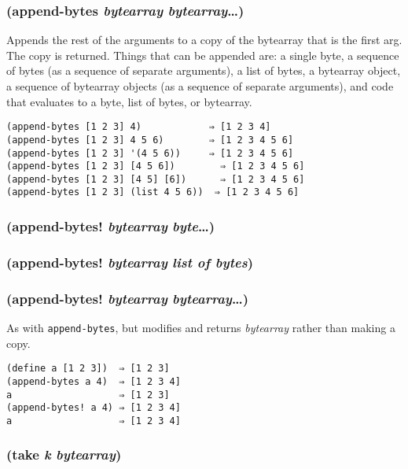 \documentclass{article}
\begin{document}
\subsubsection{(append-bytes \emph{bytearray} \emph{bytearray}\ldots{})}

Appends the rest of the arguments to a copy of the bytearray that is the first arg. The copy
is returned. Things that can be appended are: a single byte, a sequence of bytes (as a
sequence of separate arguments), a list of bytes, a bytearray object, a sequence of bytearray
objects (as a sequence of separate arguments), and code that evaluates to a byte, list of
bytes, or bytearray.

\begin{verbatim}
(append-bytes [1 2 3] 4)            ⇒ [1 2 3 4]
(append-bytes [1 2 3] 4 5 6)        ⇒ [1 2 3 4 5 6]
(append-bytes [1 2 3] '(4 5 6))     ⇒ [1 2 3 4 5 6]
(append-bytes [1 2 3] [4 5 6])        ⇒ [1 2 3 4 5 6]
(append-bytes [1 2 3] [4 5] [6])      ⇒ [1 2 3 4 5 6]
(append-bytes [1 2 3] (list 4 5 6))  ⇒ [1 2 3 4 5 6]
\end{verbatim}

\subsubsection{(append-bytes! \emph{bytearray} \emph{byte}\ldots{})}

\subsubsection{(append-bytes! \emph{bytearray} \emph{list of bytes})}

\subsubsection{(append-bytes! \emph{bytearray} \emph{bytearray}\ldots{})}

As with \verb|append-bytes|, but modifies and returns \emph{bytearray} rather than making a
copy.

\begin{verbatim}
(define a [1 2 3])  ⇒ [1 2 3]
(append-bytes a 4)  ⇒ [1 2 3 4]
a                   ⇒ [1 2 3]
(append-bytes! a 4) ⇒ [1 2 3 4]
a                   ⇒ [1 2 3 4]
\end{verbatim}

\subsubsection{(take \emph{k} \emph{bytearray})}
\end{document}
